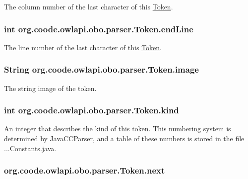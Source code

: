 The column number of the last character of this \hyperlink{classorg_1_1coode_1_1owlapi_1_1obo_1_1parser_1_1_token}{Token}. \hypertarget{classorg_1_1coode_1_1owlapi_1_1obo_1_1parser_1_1_token_a68727e8a6909dc16f1cae56734c14a6d}{
\subsubsection[{end\-Line}]{\setlength{\rightskip}{0pt plus 5cm}int org.\-coode.\-owlapi.\-obo.\-parser.\-Token.\-end\-Line}}\label{classorg_1_1coode_1_1owlapi_1_1obo_1_1parser_1_1_token_a68727e8a6909dc16f1cae56734c14a6d}
The line number of the last character of this \hyperlink{classorg_1_1coode_1_1owlapi_1_1obo_1_1parser_1_1_token}{Token}. \hypertarget{classorg_1_1coode_1_1owlapi_1_1obo_1_1parser_1_1_token_a18075f34b0eceb6632d2aa5f1dec2aff}{
\subsubsection[{image}]{\setlength{\rightskip}{0pt plus 5cm}String org.\-coode.\-owlapi.\-obo.\-parser.\-Token.\-image}}\label{classorg_1_1coode_1_1owlapi_1_1obo_1_1parser_1_1_token_a18075f34b0eceb6632d2aa5f1dec2aff}
The string image of the token. \hypertarget{classorg_1_1coode_1_1owlapi_1_1obo_1_1parser_1_1_token_a7655f501650fe2880c1e315bc3c65418}{
\subsubsection[{kind}]{\setlength{\rightskip}{0pt plus 5cm}int org.\-coode.\-owlapi.\-obo.\-parser.\-Token.\-kind}}\label{classorg_1_1coode_1_1owlapi_1_1obo_1_1parser_1_1_token_a7655f501650fe2880c1e315bc3c65418}
An integer that describes the kind of this token. This numbering system is determined by Java\-C\-C\-Parser, and a table of these numbers is stored in the file ...Constants.\-java. \hypertarget{classorg_1_1coode_1_1owlapi_1_1obo_1_1parser_1_1_token_a051d3aa7a0079ecc1bb8a4814dc4a353}{
\subsubsection[{next}]{ org.\-coode.\-owlapi.\-obo.\-parser.\-Token.\-next}}\label{classorg_1_1coode_1_1owlapi_1_1obo_1_1parser_1_1_token_a051d3aa7a0079ecc1bb8a4814dc4a353}
